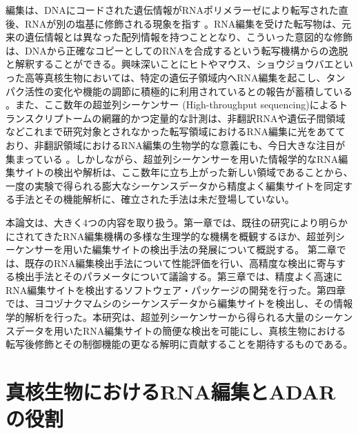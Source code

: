 編集は、DNAにコードされた遺伝情報がRNAポリメラーゼにより転写された直後、RNAが別の塩基に修飾される現象を指す \citep{Wulff:2010aa}。RNA編集を受けた転写物は、元来の遺伝情報とは異なった配列情報を持つこととなり、こういった意図的な修飾は、DNAから正確なコピーとしてのRNAを合成するという転写機構からの逸脱と解釈することができる。興味深いことにヒトやマウス、ショウジョウバエといった高等真核生物においては、特定の遺伝子領域内へRNA編集を起こし、タンパク活性の変化や機能の調節に積極的に利用されているとの報告が蓄積している \citep{Pullirsch:2010aa}。また、ここ数年の超並列シーケンサー (High-throughput sequencing)によるトランスクリプトームの網羅的かつ定量的な計測は、非翻訳RNAや遺伝子間領域などこれまで研究対象とされなかった転写領域におけるRNA編集に光をあてており、非翻訳領域におけるRNA編集の生物学的な意義にも、今日大きな注目が集まっている \citep{Nishikura:2006aa, Nis10}。しかしながら、超並列シーケンサーを用いた情報学的なRNA編集サイトの検出や解析は、ここ数年に立ち上がった新しい領域であることから、一度の実験で得られる膨大なシーケンスデータから精度よく編集サイトを同定する手法とその機能解析に、確立された手法は未だ登場していない。
\par
本論文は、大きく4つの内容を取り扱う。第一章では、既往の研究により明らかにされてきたRNA編集機構の多様な生理学的な機構を概観するほか、超並列シーケンサーを用いた編集サイトの検出手法の発展について概説する。
第二章では、既存のRNA編集検出手法について性能評価を行い、高精度な検出に寄与する検出手法とそのパラメータについて議論する。第三章では、精度よく高速にRNA編集サイトを検出するソフトウェア・パッケージの開発を行った。第四章では、ヨコヅナクマムシのシーケンスデータから編集サイトを検出し、その情報学的解析を行った。本研究は、超並列シーケンサーから得られる大量のシーケンスデータを用いたRNA編集サイトの簡便な検出を可能にし、真核生物における転写後修飾とその制御機能の更なる解明に貢献することを期待するものである。

\newpage

\section{真核生物におけるRNA編集とADARの役割}
